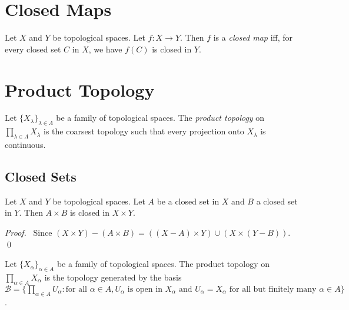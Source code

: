 \section{Closed Maps}

\begin{df}
Let $X$ and $Y$ be topological spaces. Let $f : X \rightarrow Y$. Then $f$ is a \emph{closed map} iff, for every closed set $C$ in $X$, we have $f(C)$ is closed in $Y$.
\end{df}

\section{Product Topology}

\begin{df}
Let $\{ X_\lambda \}_{\lambda \in \Lambda}$ be a family of topological spaces. The \emph{product topology} on $\prod_{\lambda \in \Lambda} X_\lambda$ is the coarsest topology such that every projection onto $X_\lambda$ is continuous.
\end{df}

\subsection{Closed Sets}

\begin{prop}
\label{prop:closed_product}
Let $X$ and $Y$ be topological spaces. Let $A$ be a closed set in $X$ and $B$ a closed set in $Y$. Then $A \times B$ is closed in $X \times Y$.
\end{prop}

\begin{proof}
\pf\ Since $(X \times Y) - (A \times B) = ((X - A) \times Y) \cup (X \times (Y - B))$. \qed
\end{proof}

\begin{prop}
\label{prop:product_basis}
Let $\{ X_\alpha \}_{\alpha \in A}$ be a family of topological spaces. The product topology on $\prod_{\alpha \in A} X_\alpha$ is the topology generated by the basis $\mathcal{B} = \{ \prod_{\alpha \in A} U_\alpha : \text{for all } \alpha \in A, U_\alpha \text{ is open in } X_\alpha \text{ and } U_\alpha = X_\alpha \text{ for all but finitely many } \alpha \in A \}$.
\end{prop}

